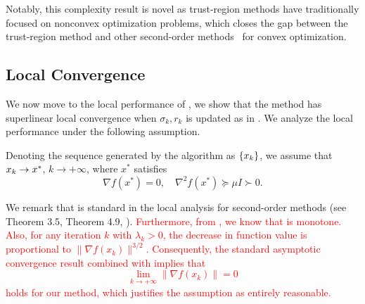 Notably, this complexity result is novel as trust-region methods have traditionally focused on nonconvex optimization problems, which closes the gap between the trust-region method and other second-order methods~\cite{nesterov2006cubic,doikov_super-universal_2024,doikov2024gradient,mishchenko_regularized_2023} for convex optimization.

\subsection{Local Convergence}
We now move to the local performance of , we show that the method has superlinear local convergence when $\sigma_k, r_k$ is updated as in .  We analyze the local performance under the following assumption.
\begin{assumption}\label{assm.localassm}
    Denoting the sequence generated by the algorithm as $\{x_k\}$, we assume that $x_k \to x^*$, $k\to +\infty$, where $x^*$ satisfies
    \begin{equation}\label{eq.local optima}
        \nabla f(x^*) = 0,\quad \nabla ^2 f(x^*) \succeq \mu I \succ 0.
    \end{equation}
\end{assumption}
We remark that  is standard in the local analysis for second-order methods (see Theorem 3.5, Theorem 4.9, \cite{nocedal1999numerical}). \textcolor{red}{Furthermore, from , we know that  is monotone. Also, for any iteration $k$ with $\lambda_k > 0$, the decrease in function value is proportional to $\|\nabla f(x_k)\|^{3/2}$. Consequently, the standard asymptotic convergence result combined with  implies that
$$\lim_{k\to+\infty}\|\nabla f(x_k)\| = 0$$ holds for our method, which justifies the assumption as entirely reasonable.}

